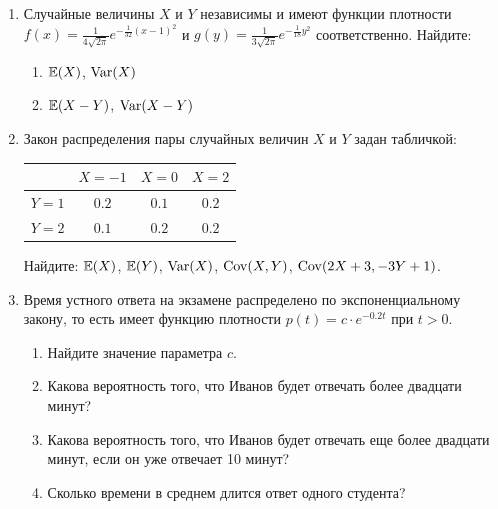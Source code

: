 \begin{enumerate}
\item Случайные величины $X$ и $Y$ независимы и имеют функции плотности
$f(x) = \frac{1}{4\sqrt{2\pi}} e^{-\frac{1}{32} (x-1)^{2} }$ и
$g(y)=\frac{1}{3\sqrt{2\pi}} e^{-\frac{1}{18} y^{2} }$ соответственно.
Найдите:
\begin{enumerate}
\item $\operatorname{\mathbb{E}}(X)$, $\operatorname{Var}(X)$
\item $\operatorname{\mathbb{E}}(X - Y)$, $\operatorname{Var}(X - Y)$
\end{enumerate}


\item Закон распределения пары случайных величин $X$ и $Y$ задан табличкой:

\begin{center}
\begin{tabular}{@{}cccc@{}}
\toprule
    & $X=-1$ & $X=0$ & $X=2$ \\ \midrule
$Y=1$ & $0.2$  & $0.1$   & $0.2$ \\
$Y=2$ & $0.1$  & $0.2$ & $0.2$ \\ \bottomrule
\end{tabular}
\end{center}

Найдите: $\operatorname{\mathbb{E}}(X)$, $\operatorname{\mathbb{E}}(Y)$, $\operatorname{Var}(X)$, $\operatorname{Cov}(X, Y)$, $\operatorname{Cov}(2X + 3, -3Y + 1)$.

\item Время устного ответа на экзамене распределено по экспоненциальному закону,
то есть имеет функцию плотности $p(t) = c \cdot e^{-0.2 t}$ при $t > 0$.
\begin{enumerate}
\item Найдите значение параметра $c$.
\item Какова вероятность того, что Иванов будет отвечать более двадцати минут?
\item Какова вероятность того, что Иванов будет отвечать еще более двадцати минут,
если он уже отвечает 10 минут?
\item Сколько времени в среднем длится ответ одного студента?
\end{enumerate}


\end{enumerate}
